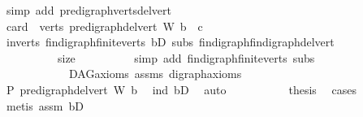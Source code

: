 \begin{isabellebody}
\ {\isacharparenleft}{\kern0pt}simp\ add{\isacharcolon}{\kern0pt}\ pre{\isacharunderscore}{\kern0pt}digraph{\isachardot}{\kern0pt}verts{\isacharunderscore}{\kern0pt}del{\isacharunderscore}{\kern0pt}vert{\isacharparenright}{\kern0pt}\ \isanewline
\ \ \ \ \ \ \isamarkupfalse%
\ \isamarkupfalse%
\ {\isachardoublequoteopen}card\ {\isacharparenleft}{\kern0pt}\ verts\ {\isacharparenleft}{\kern0pt}pre{\isacharunderscore}{\kern0pt}digraph{\isachardot}{\kern0pt}del{\isacharunderscore}{\kern0pt}vert\ W\ b{\isacharparenright}{\kern0pt}{\isacharparenright}{\kern0pt}\ {\isacharequal}{\kern0pt}\ c{\isachardoublequoteclose}\ \isanewline
\ \ \ \ \ \ \ \ \isamarkupfalse%
\ in{\isacharunderscore}{\kern0pt}verts\ fin{\isacharunderscore}{\kern0pt}digraph{\isachardot}{\kern0pt}finite{\isacharunderscore}{\kern0pt}verts\ bD\ subs\ fin{\isacharunderscore}{\kern0pt}digraph{\isachardot}{\kern0pt}fin{\isacharunderscore}{\kern0pt}digraph{\isacharunderscore}{\kern0pt}del{\isacharunderscore}{\kern0pt}vert\ \isanewline
\ \ \ \ \ \ \ \ \ \ size\isanewline
\ \ \ \ \ \ \ \ \isamarkupfalse%
\ {\isacharparenleft}{\kern0pt}simp\ add{\isacharcolon}{\kern0pt}\ fin{\isacharunderscore}{\kern0pt}digraph{\isachardot}{\kern0pt}finite{\isacharunderscore}{\kern0pt}verts\ subs\isanewline
\ \ \ \ \ \ \ \ \ \ \ \ DAG{\isachardot}{\kern0pt}axioms\ assms{\isacharparenleft}{\kern0pt}{}{\isacharparenright}{\kern0pt}\ digraph{\isachardot}{\kern0pt}axioms{\isacharparenright}{\kern0pt}\ \isanewline
\ \ \ \ \ \ \isamarkupfalse%
\ \isamarkupfalse%
\ {\isachardoublequoteopen}P\ {\isacharparenleft}{\kern0pt}pre{\isacharunderscore}{\kern0pt}digraph{\isachardot}{\kern0pt}del{\isacharunderscore}{\kern0pt}vert\ W\ b{\isacharparenright}{\kern0pt}{\isachardoublequoteclose}\ \isamarkupfalse%
\ ind\ bD{}\ \isamarkupfalse%
\ auto\isanewline
\ \ \ \ \isamarkupfalse%
\isanewline
\ \ \ \ \isamarkupfalse%
\ {\isachardoublequoteopen}{\isacharquery}{\kern0pt}thesis{\isachardoublequoteclose}\ \isamarkupfalse%
\ cases{\isacharparenleft}{\kern0pt}{}{\isacharparenright}{\kern0pt}\isanewline
\ \ \ \ \ \ \isamarkupfalse%
\ {\isacharparenleft}{\kern0pt}metis\ assm{}\ bD{\isacharparenright}{\kern0pt}\ \isanewline
\ \ \isamarkupfalse%
\isanewline
{}\isamarkupfalse%
%
\endisatagproof
{\isafoldproof}%
%
\isadelimproof
\ \isanewline
%
\endisadelimproof
\isanewline
{}\isamarkupfalse%

\end{isabellebody}
